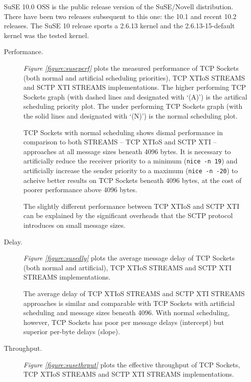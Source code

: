 \documentclass[letterpaper,final,notitlepage,twocolumn,10pt,twoside]{article}
\begin{document}
SuSE 10.0 OSS is the public release version of the SuSE/Novell distribution.  There have been two
releases subsequent to this one: the 10.1 and recent 10.2 releases.  The SuSE 10 release sports a
2.6.13 kernel and the 2.6.13-15-default kernel was the tested kernel.

\begin{description}

\item[Performance.]

\textit{Figure \ref{figure:suseperf}}
plots the measured performance of TCP Sockets (both normal and artificial scheduling priorities),
TCP XTIoS STREAMS and SCTP XTI STREAMS implementations.
The higher performing TCP Sockets graph (with dashed lines and designated with `(A)') is the
artifical scheduling priority plot.  The under performing TCP Sockets graph (with the solid lines
and designated with `(N)') is the normal scheduling plot.

TCP Sockets with normal scheduling shows dismal performance in comparison to both STREAMS -- TCP
XTIoS and SCTP XTI -- approaches at all message sizes beneath 4096 bytes.  It is necessary to
artificially reduce the receiver priority to a minimum (\texttt{nice -n 19}) and artificially
increase the sender priority to a maximum (\texttt{nice -n -20}) to acheive better results on TCP
Sockets beneath 4096 bytes, at the cost of poorer performance above 4096 bytes.

The slightly different performance between TCP XTIoS and SCTP XTI can be explained by the
significant overheads that the SCTP protocol introduces on small message sizes.

\item[Delay.]

\textit{Figure \ref{figure:susedly}}
plots the average message delay of TCP Sockets (both normal and artificial), TCP XTIoS STREAMS and
SCTP XTI STREAMS implementations.

The average delay of TCP XTIoS STREAMS and SCTP XTI STREAMS approaches is similar and comparable
with TCP Sockets with artificial scheduling and message sizes beneath 4096.  With normal scheduling,
however, TCP Sockets has poor per message delays (intercept) but superior per-byte delays (slope).

\item[Throughput.]

\textit{Figure \ref{figure:susethrput}}
plots the effective throughput of TCP Sockets, TCP XTIoS STREAMS and SCTP XTI STREAMS
implementations.


\end{description}
\end{document}
